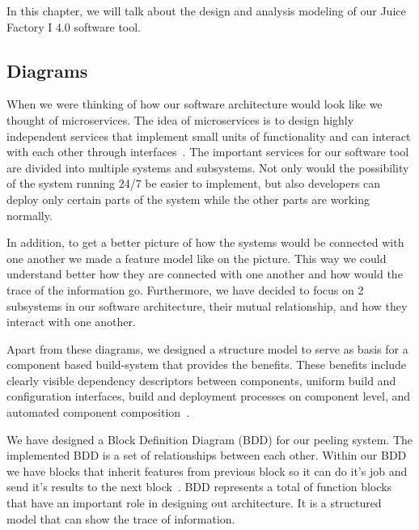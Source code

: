\documentclass[conference]{IEEEtran}
\begin{document}

\color{black}

In this chapter, we will talk about the design and analysis modeling of our Juice Factory I 4.0 software tool. 
\subsection{Diagrams}
When we were thinking of how our software architecture would look like we thought of microservices. The idea of microservices is to design highly independent services that implement small units of functionality and can interact with each other through interfaces~\cite{b6}. The important services for our software tool are divided into multiple systems and subsystems. Not only would the possibility of the system running 24/7 be easier to implement, but also developers can deploy only certain parts of the system while the other parts are working normally.

In addition, to get a better picture of how the systems would be connected with one another we made a feature model like on the picture. This way we could understand better how they are connected with one another and how would the trace of the information go. Furthermore, we have decided to focus on 2 subsystems in our software architecture, their mutual relationship, and how they interact with one another. 

Apart from these diagrams, we designed a structure model to serve as basis for a component based build-system that provides the benefits. These benefits include clearly visible dependency descriptors between components, uniform build and configuration interfaces, build and deployment processes on component level, and automated component composition~\cite{b11}. 

We have designed a Block Definition Diagram (BDD) for our peeling system. The implemented BDD is a set of relationships between each other. Within our BDD we have blocks that inherit features from previous block so it can do it's job and send it's results to the next block~\cite{b4}. BDD represents a total of function blocks that have an important role in designing out architecture. It is a structured model that can show the trace of information. 
\end{document}
